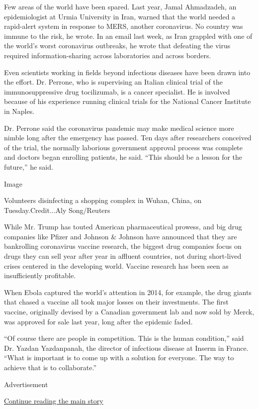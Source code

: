 Few areas of the world have been spared. Last year, Jamal Ahmadzadeh, an
epidemiologist at Urmia University in Iran, warned that the world needed
a rapid-alert system in response to MERS, another coronavirus. No
country was immune to the risk, he wrote. In an email last week, as Iran
grappled with one of the world's worst coronavirus outbreaks, he wrote
that defeating the virus required information-sharing across
laboratories and across borders.

Even scientists working in fields beyond infectious diseases have been
drawn into the effort. Dr. Perrone, who is supervising an Italian
clinical trial of the immunosuppressive drug tocilizumab, is a cancer
specialist. He is involved because of his experience running clinical
trials for the National Cancer Institute in Naples.

Dr. Perrone said the coronavirus pandemic may make medical science more
nimble long after the emergency has passed. Ten days after researchers
conceived of the trial, the normally laborious government approval
process was complete and doctors began enrolling patients, he said.
``This should be a lesson for the future,'' he said.

Image

Volunteers disinfecting a shopping complex in Wuhan, China, on
Tuesday.Credit...Aly Song/Reuters

While Mr. Trump has touted American pharmaceutical prowess, and big drug
companies like Pfizer and Johnson \& Johnson have announced that they
are bankrolling coronavirus vaccine research, the biggest drug companies
focus on drugs they can sell year after year in affluent countries, not
during short-lived crises centered in the developing world. Vaccine
research has been seen as insufficiently profitable.

When Ebola captured the world's attention in 2014, for example, the drug
giants that chased a vaccine all took major losses on their investments.
The first vaccine, originally devised by a Canadian government lab and
now sold by Merck, was approved for sale last year, long after the
epidemic faded.

``Of course there are people in competition. This is the human
condition,'' said Dr. Yazdan Yazdanpanah, the director of infectious
disease at Inserm in France. ``What is important is to come up with a
solution for everyone. The way to achieve that is to collaborate.''

Advertisement

\protect\hyperlink{after-bottom}{Continue reading the main story}

